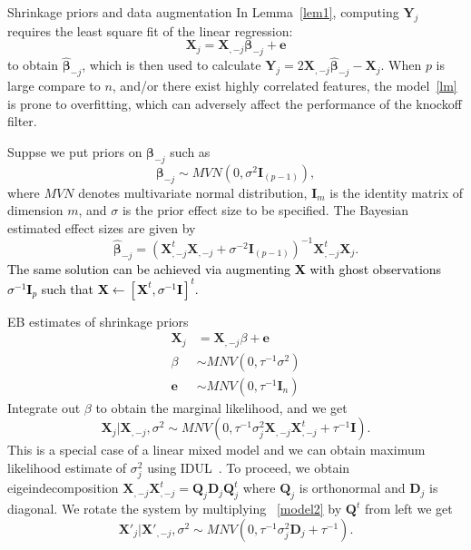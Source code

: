 \documentclass[]{beamer}
\def\tcb{\textcolor{black}}
\def\D{{\mathbf{D}}}
\def\e{{\mathbf{e}}}
\def\X{{\mathbf{X}}}
\def\Y{{\mathbf{Y}}}
\def\mbeta{{\mathbf{\beta}}}
\def\Q{{\mathbf{Q}}}
\def\D{{\mathbf{D}}}
\def\I{{\mathbf{I}}}
\begin{document}
\begin{frame}{Shrinkage priors and data augmentation}
In Lemma~\ref{lem1}, computing $\Y_j$ requires  the least square fit of the linear regression: 
\begin{equation} \label{lm}
\X_j = \X_{,-j} \mbeta_{-j} + \e
\end{equation}
to obtain $\hat\mbeta_{-j}$, which is then used to calculate $\Y_j = 2 \X_{,-j} \hat\mbeta_{-j}  - \X_j$.  
When $p$ is large compare to $n$, and/or there exist highly correlated features, the model~\eqref{lm} is prone to overfitting, which can adversely affect the performance of the knockoff filter. 

Suppse we put priors on $\mbeta_{-j}$ such as
\begin{equation} \label{prior}
\mbeta_{-j} \sim MVN(0, \sigma^2 \I_{(p-1)}), 
\end{equation} 
where $MVN$ denotes multivariate normal distribution, $\I_m$ is the identity matrix of dimension $m$, and $\sigma$ is the prior effect size to be specified. The Bayesian estimated effect sizes are given by 
\begin{equation} \label{betahat}
\hat\mbeta_{-j} = \left(\X_{,-j}^t \X_{,-j} + \sigma^{-2} \I_{(p-1)}\right)^{-1}  \X_{,-j}^t \X_j.
\end{equation} 
\tcb{The same solution can be achieved via augmenting $\X$ with ghost observations $\sigma^{-1} \I_p$ such that $\X \leftarrow [\X^t, \sigma^{-1} \I]^t$.} 


\end{frame}



\begin{frame}{EB estimates of shrinkage priors}
\begin{equation}
\begin{aligned}\label{model2}
\X_j &= \X_{,-j} \beta + \e \\
    \beta &\sim MNV(0, \tau^{-1} \sigma^2) \\
    \e & \sim MNV(0, \tau^{-1} \I_n) 
\end{aligned}
\end{equation}
Integrate out $\beta$ to obtain the marginal likelihood, and we get 
\begin{equation}
\X_j|\X_{,-j}, \sigma^2 \sim MNV(0, \tau^{-1} \sigma_j^2 \X_{,-j}\X_{,-j}^t + \tau^{-1}\I).  
\end{equation}
This is a special case of a linear mixed model and we can obtain maximum likelihood estimate of $\sigma_j^2$ using IDUL~\cite{idul}. 
To proceed, we obtain eigeindecomposition $\X_{,-j}\X_{,-j}^t = \Q_j\D_j\Q_j^t$ where $\Q_j$ is orthonormal and $\D_j$ is diagonal. 
We rotate the system by multiplying ~\eqref{model2} by $\Q^t$ from left we get 
\begin{equation} \label{ebj}
\X'_j | \X'_{,-j}, \sigma^2 \sim MNV(0, \tau^{-1} \sigma_j^2 \D_j + \tau^{-1}).
\end{equation}

\end{frame}
\end{document}
